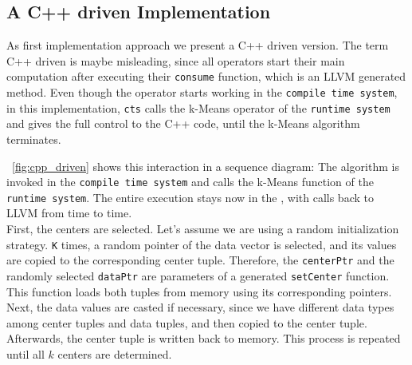 \subsection{A C++ driven Implementation}

As first implementation approach we present a C++ driven version. The term C++ driven is maybe misleading, since all operators start their main computation after executing their \texttt{consume} function, which is an LLVM generated method. Even though the operator starts working in the \texttt{compile time system}, in this implementation, \texttt{cts} calls the k-Means operator of the \texttt{runtime system} and gives the full control to the C++ code, until the k-Means algorithm terminates. 

~\autoref{fig:cpp_driven} shows this interaction in a sequence diagram: The algorithm is invoked in the \texttt{compile time system} and calls the k-Means function of the \texttt{runtime system}. The entire execution stays now in the , with calls back to LLVM from time to time. 
\\
First, the centers are selected. Let’s assume we are using a random initialization strategy. \texttt{K} times, a random pointer of the data vector is selected, and its values are copied to the corresponding center tuple. Therefore, the \texttt{centerPtr} and the randomly selected \texttt{dataPtr} are parameters of a generated \texttt{setCenter} function. This function loads both tuples from memory using its corresponding pointers. Next, the data values are casted if necessary, since we have different data types among center tuples and data tuples, and then copied to the center tuple. Afterwards, the center tuple is written back to memory. This process is repeated until all $k$ centers are determined.

